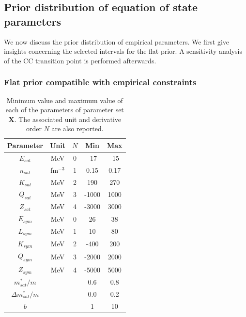 \subsection{Prior distribution of equation of state parameters}\label{subsec:prior}

We now discuss the prior distribution of empirical parameters. We first give 
insights concerning the selected intervals for the flat prior. A sensitivity 
analysis of the CC transition point is performed afterwards.

\subsubsection{Flat prior compatible with empirical constraints}\label{subsubsec:prior}

\begin{table}[!t]
  \begin{center}
    \begin{tabular}{ccccc} 
      \toprule
      \toprule
      Parameter & Unit & $N$ & Min & Max \\
      \midrule
      $E_{sat}$ & MeV & 0         & -17   & -15  \\
      $n_{sat}$ & fm$^{-3}$ & 1   & 0.15  & 0.17 \\ 
      $K_{sat}$ & MeV & 2         & 190   & 270  \\ 
      $Q_{sat}$ & MeV & 3         & -1000 & 1000 \\ 
      $Z_{sat}$ & MeV & 4         & -3000 & 3000 \\ 
      $E_{sym}$ & MeV & 0         & 26    & 38   \\
      $L_{sym}$ & MeV & 1         & 10    & 80   \\
      $K_{sym}$ & MeV & 2         & -400  & 200  \\
      $Q_{sym}$ & MeV & 3         & -2000 & 2000 \\
      $Z_{sym}$ & MeV & 4         & -5000 & 5000 \\
      $m_{sat}^*/m$ & &           & 0.6   & 0.8  \\
      $\Delta m_{sat}^*/m$ & &    & 0.0   & 0.2  \\
      $b$ & &                     & 1     & 10   \\
      \bottomrule
      \bottomrule
    \end{tabular}
  \end{center}
  \caption[Minimum value and maximum value of each of the empirical parameters
  for the prior distribution]{Minimum value and maximum value of each of the
    parameters of parameter set $\bm{X}$. The associated unit and derivative 
  order $N$ are also reported.}\label{table:prior}
\end{table}

